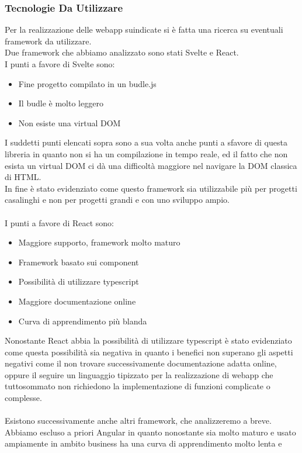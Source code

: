 \subsubsection{Tecnologie Da Utilizzare}
Per la realizzazione delle webapp suindicate si è fatta una ricerca su eventuali framework da utilizzare.\\
Due framework che abbiamo analizzato sono stati Svelte e React.\\
I punti a favore di Svelte sono:
\begin{itemize}
	\item Fine progetto compilato in un budle.js
	\item Il budle è molto leggero
	\item Non esiste una virtual DOM
\end{itemize}
I suddetti punti elencati sopra sono a sua volta anche punti a sfavore di questa libreria in quanto non si ha un compilazione in tempo reale,
ed il fatto che non esista un virtual DOM ci dà una difficoltà maggiore nel navigare la DOM classica di HTML.\\
In fine è stato evidenziato come questo framework sia utilizzabile più per progetti casalinghi e non per progetti grandi e con uno sviluppo ampio.\\
\\
I punti a favore di React sono:
\begin{itemize}
	\item Maggiore supporto, framework molto maturo
	\item Framework basato sui component
	\item Possibilità di utilizzare typescript
	\item Maggiore documentazione online
	\item Curva di apprendimento più blanda
\end{itemize}
Nonostante React abbia la possibilità di utilizzare typescript è stato evidenziato come questa possibilità sia negativa in quanto i benefici non superano gli aspetti negativi come il non trovare successivamente documentazione 
adatta online, oppure il seguire un linguaggio tipizzato per la realizzazione di webapp che tuttosommato non richiedono la implementazione di funzioni complicate o complesse.\\
\\
Esistono successivamente anche altri framework, che analizzeremo a breve.\\
Abbiamo escluso a priori Angular in quanto nonostante sia molto maturo e usato ampiamente in ambito business ha una curva di apprendimento molto lenta e 
